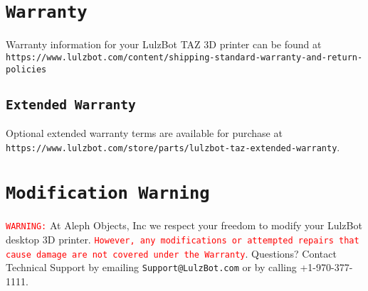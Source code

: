 %
%
%
%
%

\section{\texttt{Warranty}}
Warranty information for your LulzBot\textsuperscript{\miniscule{\textregistered}} TAZ 3D printer can be found at \texttt{https://www.lulzbot.com/content/shipping-standard-warranty-and-return-policies}

\subsection{\texttt{Extended Warranty}}
Optional extended warranty terms are available for purchase at \texttt{https://www.lulzbot.com/store/parts/lulzbot-taz-extended-warranty}.

\section{\texttt{Modification Warning}}
\textcolor{red}{\texttt{WARNING:}} At Aleph Objects, Inc\textsuperscript{\miniscule{\textregistered}} we respect your freedom to modify your LulzBot desktop 3D printer. \textcolor{red}{\texttt{However, any modifications or attempted repairs that cause damage are not covered under the Warranty}}. Questions? Contact Technical Support by emailing \texttt{Support@LulzBot.com} or by calling +1-970-377-1111.
